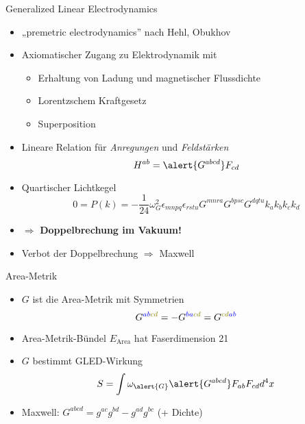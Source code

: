 \documentclass{beamer}
\begin{document}
    \begin{frame}{Generalized Linear Electrodynamics}
        \begin{itemize}
            \item „premetric electrodynamics” nach Hehl, Obukhov
            \item Axiomatischer Zugang zu Elektrodynamik mit
            \begin{itemize}
                \item Erhaltung von Ladung und magnetischer Flussdichte
                \item Lorentzschem Kraftgesetz
                \item Superposition
            \end{itemize}
            \item Lineare Relation für \textit{Anregungen} und \textit{Feldstärken}
            \[
                H^{ab} = \alert{G^{abcd}} F_{cd}
            \]
            \item Quartischer Lichtkegel \[ 0 = P(k) = -\frac{1}{24} \omega_G^2 \epsilon_{mnpq} \epsilon_{rstu} G^{mnra} G^{bpsc} G^{dqtu} k_a k_b k_c k_d \]
            \item $\Rightarrow$ \textbf{Doppelbrechung im Vakuum!}
            \item Verbot der Doppelbrechung $\Rightarrow$ Maxwell
        \end{itemize}
    \end{frame}

    \begin{frame}{Area-Metrik}
        \begin{itemize}
            \item \alert{$G$} ist die \alert{Area-Metrik} mit Symmetrien
            \[ G^{\color{blue}ab\color{olive}cd} = -G^{\color{blue}ba\color{olive}cd} = G^{\color{olive}cd\color{blue}ab} \]
            \item Area-Metrik-Bündel $E_\text{Area}$ hat Faserdimension 21
            \item $G$ bestimmt GLED-Wirkung \[ S = \int \omega_{\alert{G}} \alert{G^{abcd}} F_{ab} F_{cd} d^4 x \]
            \item Maxwell: $G^{abcd} = g^{ac} g^{bd} - g^{ad} g^{bc}$ (+ Dichte)
        \end{itemize}
    \end{frame}
\end{document}
